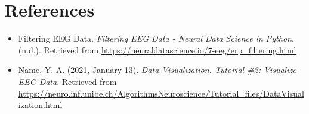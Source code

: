 \documentclass{article}
\begin{document}
\section{References}
\begin{itemize}
    \item Filtering EEG Data. \emph{Filtering EEG Data - Neural Data Science in Python}. (n.d.). Retrieved from \url{https://neuraldatascience.io/7-eeg/erp_filtering.html}
    \item Name, Y. A. (2021, January 13). \emph{Data Visualization. Tutorial \#2: Visualize EEG Data}. Retrieved from \url{https://neuro.inf.unibe.ch/AlgorithmsNeuroscience/Tutorial_files/DataVisualization.html}
\end{itemize}
\end{document}
